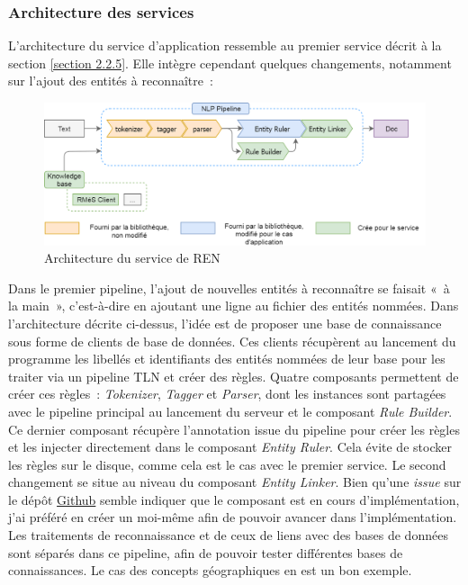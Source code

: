 \subsubsection*{Architecture des services}
L'architecture du service d'application ressemble au premier service décrit à la section \ref{section 2.2.5}. Elle intègre cependant quelques changements, notamment sur l'ajout des entités à reconnaître~:
\vspace{10pt}
\begin{figure}[H]
    \centering
    \includegraphics[scale=0.36]{images/InspaCy-archi.png}
    \caption{Architecture du service de REN}
    \label{fig:inspacy-archi}
\end{figure}
\vspace{10pt}

Dans le premier pipeline, l'ajout de nouvelles entités à reconnaître se faisait «~à la main~», c'est-à-dire en ajoutant une ligne au fichier des entités nommées. Dans l'architecture décrite ci-dessus, l'idée est de proposer une base de connaissance sous forme de clients de base de données. Ces clients récupèrent au lancement du programme les libellés et identifiants des entités nommées de leur base pour les traiter via un pipeline TLN et créer des règles. Quatre composants permettent de créer ces règles~: \textit{Tokenizer}, \textit{Tagger} et \textit{Parser}, dont les instances sont partagées avec le pipeline principal au lancement du serveur et le composant \textit{Rule Builder}. Ce dernier composant récupère l'annotation issue du pipeline pour créer les règles et les injecter directement dans le composant \textit{Entity Ruler}. Cela évite de stocker les règles sur le disque, comme cela est le cas avec le premier service.
Le second changement se situe au niveau du composant \textit{Entity Linker}. Bien qu'une \textit{issue} sur le dépôt \href{https://github.com/explosion/spaCy/issues}{Github} \cite{spacy-repo} semble indiquer que le composant est en cours d'implémentation, j'ai préféré en créer un moi-même afin de pouvoir avancer dans l'implémentation. Les traitements de reconnaissance et de ceux de liens avec des bases de données sont séparés dans ce pipeline, afin de pouvoir tester différentes bases de connaissances. Le cas des concepts géographiques en est un bon exemple.
\newline

